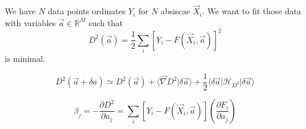 \documentclass[aps,12pt]{revtex4}
\begin{document}
We have $N$ data points ordinates $Y_i$ for $N$ absiscae $\vec X_i$.
We want to fit those data with variables $\vec a \in \mathbb R^M$
such that
\begin{equation}
	D^2(\vec a) = \dfrac{1}{2} \sum_i \left[ Y_i - F(\vec X_i,\vec a) \right]^2 
\end{equation}
is minimal.

\begin{equation}
	D^2(\vec a + \delta a) \simeq D^2(\vec a) + \langle \vec \nabla D^2 \vert \delta \vec a \rangle
	 + \dfrac{1}{2} \langle \delta \vec a \vert \mathcal H_{D^2} \vert \delta \vec a\rangle
\end{equation}
	
\begin{equation}
	\beta_j = - \dfrac{\partial D^2}{\partial a_j} = \sum_i \left[ Y_i - F(\vec X_i,\vec a) \right] \left( \dfrac{\partial F_i}{\partial a_j} \right)
\end{equation}
\end{document}
